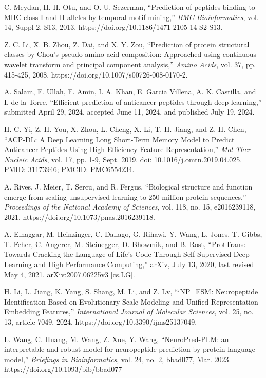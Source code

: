 \documentclass[conference]{IEEEtran}
\begin{document}
\begin{thebibliography}{1}

 C. Meydan, H. H. Otu, and O. U. Sezerman, ``Prediction of peptides binding to MHC class I and II alleles by temporal motif mining,'' \emph{BMC Bioinformatics}, vol. 14, Suppl 2, S13, 2013. https://doi.org/10.1186/1471-2105-14-S2-S13.

 Z. C. Li, X. B. Zhou, Z. Dai, and X. Y. Zou, ``Prediction of protein structural classes by Chou’s pseudo amino acid composition: Approached using continuous wavelet transform and principal component analysis,'' \emph{Amino Acids}, vol. 37, pp. 415-425, 2008. https://doi.org/10.1007/s00726-008-0170-2.

 A. Salam, F. Ullah, F. Amin, I. A. Khan, E. Garcia Villena, A. K. Castilla, and I. de la Torre, ``Efficient prediction of anticancer peptides through deep learning,'' submitted April 29, 2024, accepted June 11, 2024, and published July 19, 2024.

 H. C. Yi, Z. H. You, X. Zhou, L. Cheng, X. Li, T. H. Jiang, and Z. H. Chen, ``ACP-DL: A Deep Learning Long Short-Term Memory Model to Predict Anticancer Peptides Using High-Efficiency Feature Representation,'' \emph{Mol Ther Nucleic Acids}, vol. 17, pp. 1-9, Sept. 2019. doi: 10.1016/j.omtn.2019.04.025. PMID: 31173946; PMCID: PMC6554234.

 A. Rives, J. Meier, T. Sercu, and R. Fergus, ``Biological structure and function emerge from scaling unsupervised learning to 250 million protein sequences,'' \emph{Proceedings of the National Academy of Sciences}, vol. 118, no. 15, e2016239118, 2021. https://doi.org/10.1073/pnas.2016239118.

 A. Elnaggar, M. Heinzinger, C. Dallago, G. Rihawi, Y. Wang, L. Jones, T. Gibbs, T. Feher, C. Angerer, M. Steinegger, D. Bhowmik, and B. Rost, ``ProtTrans: Towards Cracking the Language of Life's Code Through Self-Supervised Deep Learning and High Performance Computing,'' arXiv, July 13, 2020, last revised May 4, 2021. arXiv:2007.06225v3 [cs.LG].

 H. Li, L. Jiang, K. Yang, S. Shang, M. Li, and Z. Lv, ``iNP\_ESM: Neuropeptide Identification Based on Evolutionary Scale Modeling and Unified Representation Embedding Features,'' \emph{International Journal of Molecular Sciences}, vol. 25, no. 13, article 7049, 2024. https://doi.org/10.3390/ijms25137049.

 L. Wang, C. Huang, M. Wang, Z. Xue, Y. Wang, ``NeuroPred-PLM: an interpretable and robust model for neuropeptide prediction by protein language model,'' \emph{Briefings in Bioinformatics}, vol. 24, no. 2, bbad077, Mar. 2023. https://doi.org/10.1093/bib/bbad077

\end{thebibliography}

\smallskip
\end{document}
